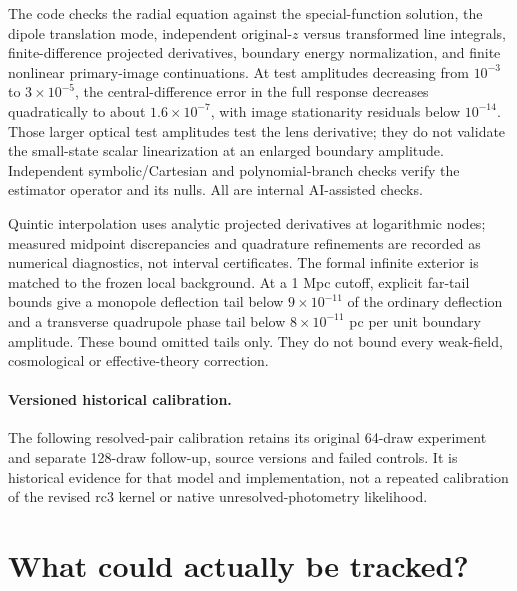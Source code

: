\documentclass[11pt,a4paper]{article}
\begin{document}
The code checks the radial equation against the special-function
solution, the dipole translation mode, independent original-$z$ versus
transformed line integrals, finite-difference projected derivatives,
boundary energy normalization, and finite nonlinear primary-image
continuations. At test amplitudes decreasing from $10^{-3}$ to
$3\times10^{-5}$, the central-difference error in the full response
decreases quadratically to about $1.6\times10^{-7}$, with image
stationarity residuals below $10^{-14}$. Those larger optical test
amplitudes test the lens derivative; they do not validate the small-state
scalar linearization at an enlarged boundary amplitude. Independent
symbolic/Cartesian and polynomial-branch checks verify the estimator
operator and its nulls. All are internal AI-assisted checks.

Quintic interpolation uses analytic projected derivatives at logarithmic
nodes; measured midpoint discrepancies and quadrature refinements are
recorded as numerical diagnostics, not interval certificates. The formal
infinite exterior is matched to the frozen local background. At a
1 Mpc cutoff, explicit far-tail bounds give a monopole deflection tail
below $9\times10^{-11}$ of the ordinary deflection and a transverse
quadrupole phase tail below $8\times10^{-11}$ pc per unit boundary
amplitude. These bound omitted tails only. They do not bound every
weak-field, cosmological or effective-theory correction.


\paragraph{Versioned historical calibration.}
The following resolved-pair calibration retains its original 64-draw
experiment and separate 128-draw follow-up, source versions and failed
controls. It is historical evidence for that model and implementation,
not a repeated calibration of the revised rc3 kernel or native
unresolved-photometry likelihood.






\section{What could actually be tracked?}
\end{document}
